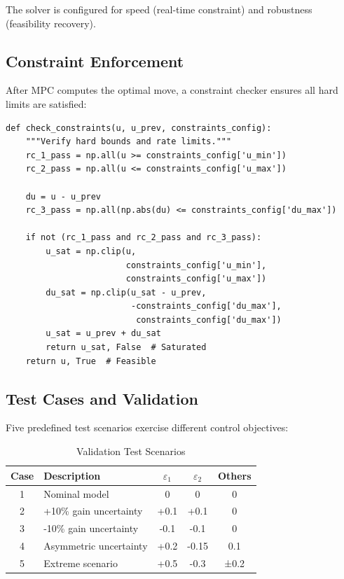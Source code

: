 \documentclass[conference]{IEEEtran}
\begin{document}
The solver is configured for speed (real-time constraint) and robustness (feasibility recovery).

\subsection{Constraint Enforcement}

After MPC computes the optimal move, a constraint checker ensures all hard limits are satisfied:

\begin{lstlisting}[caption=Constraint Checker]
def check_constraints(u, u_prev, constraints_config):
    """Verify hard bounds and rate limits."""
    rc_1_pass = np.all(u >= constraints_config['u_min'])
    rc_2_pass = np.all(u <= constraints_config['u_max'])

    du = u - u_prev
    rc_3_pass = np.all(np.abs(du) <= constraints_config['du_max'])

    if not (rc_1_pass and rc_2_pass and rc_3_pass):
        u_sat = np.clip(u,
                        constraints_config['u_min'],
                        constraints_config['u_max'])
        du_sat = np.clip(u_sat - u_prev,
                         -constraints_config['du_max'],
                          constraints_config['du_max'])
        u_sat = u_prev + du_sat
        return u_sat, False  # Saturated
    return u, True  # Feasible
\end{lstlisting}

\subsection{Test Cases and Validation}

Five predefined test scenarios exercise different control objectives:

\begin{table}[h]
\centering
\caption{Validation Test Scenarios}
\begin{tabular}{|c|l|c|c|c|}
\hline
\textbf{Case} & \textbf{Description} & \textbf{$\varepsilon_1$} & \textbf{$\varepsilon_2$} & \textbf{Others} \\
\hline
1 & Nominal model & 0 & 0 & 0 \\
2 & +10\% gain uncertainty & +0.1 & +0.1 & 0 \\
3 & -10\% gain uncertainty & -0.1 & -0.1 & 0 \\
4 & Asymmetric uncertainty & +0.2 & -0.15 & 0.1 \\
5 & Extreme scenario & +0.5 & -0.3 & ±0.2 \\
\hline
\end{tabular}
\end{table}
\end{document}
